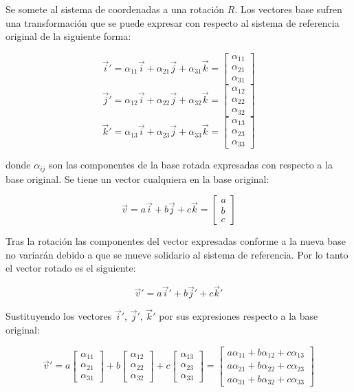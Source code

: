 \documentclass[12pt, a4paper]{report}
\begin{document}
Se somete al sistema de coordenadas a una rotación $R$. Los vectores base sufren una transformación que se puede expresar con respecto al sistema de referencia original de la siguiente forma:

$$ \vec{i}' = \alpha_{11}\vec{i} + \alpha_{21}\vec{j} + \alpha_{31}\vec{k} = \begin{bmatrix}  \alpha_{11}\\\alpha_{21}\\\alpha_{31} \end{bmatrix} $$
$$ \vec{j}' = \alpha_{12}\vec{i} + \alpha_{22}\vec{j} + \alpha_{32}\vec{k} = \begin{bmatrix} \alpha_{12}\\\alpha_{22}\\\alpha_{32} \end{bmatrix} $$
$$ \vec{k}' = \alpha_{13}\vec{i} + \alpha_{23}\vec{j} + \alpha_{33}\vec{k} = \begin{bmatrix} \alpha_{13}\\\alpha_{23}\\\alpha_{33} \end{bmatrix} $$

donde $\alpha_{ij}$ son las componentes de la base rotada expresadas con respecto a la base original. Se tiene un vector cualquiera en la base original:

$$ \vec{v} = a\vec{i} + b\vec{j} + c\vec{k} = \begin{bmatrix} a\\b\\c \end{bmatrix} $$

Tras la rotación las componentes del vector expresadas conforme a la nueva base no variarán debido a que se mueve solidario al sistema de referencia. Por lo tanto el vector rotado es el siguiente:

$$ \vec{v}' = a\vec{i}' + b\vec{j}' + c\vec{k}' $$

Sustituyendo los vectores $\vec{i}'$, $\vec{j}'$, $\vec{k}'$ por sus expresiones respecto a la base original:

$$ \vec{v}' = a \begin{bmatrix}  \alpha_{11}\\\alpha_{21}\\\alpha_{31} \end{bmatrix} + b \begin{bmatrix}  \alpha_{12}\\\alpha_{22}\\\alpha_{32} \end{bmatrix}  + c \begin{bmatrix}  \alpha_{13}\\\alpha_{23}\\\alpha_{33} \end{bmatrix} = \begin{bmatrix}  a\alpha_{11} + b\alpha_{12} + c\alpha_{13} \\ a\alpha_{21} + b\alpha_{22} + c\alpha_{23}\\ a\alpha_{31} + b\alpha_{32} + c\alpha_{33} \end{bmatrix} $$
\end{document}
